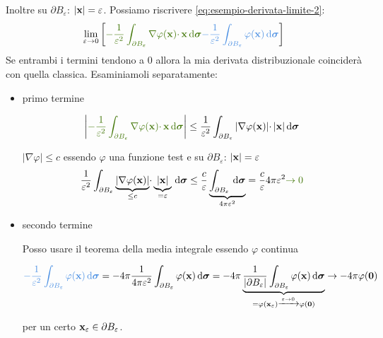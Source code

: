Inoltre su $\displaystyle \partial B_{\varepsilon }$: $\displaystyle | \mathbf{x}| =\varepsilon $. Possiamo riscrivere \eqref{eq:esempio-derivata-limite-2}:
\begin{equation*}
    \lim _{\varepsilon \rightarrow 0}\left[\textcolor[rgb]{0.25,0.46,0.02}{-\frac{1}{\varepsilon ^{2}}\int _{\partial B_{\varepsilon }} \nabla \varphi (\x) \cdotp \x \dsig }\textcolor[rgb]{0.29,0.56,0.89}{-\frac{1}{\varepsilon ^{2}}\int _{\partial B_{\varepsilon }} \varphi (\x) \dsig }\right]
\end{equation*}
Se entrambi i termini tendono a $0$ allora la mia derivata distribuzionale coinciderà con quella classica. Esaminiamoli separatamente:
\begin{itemize}
    \item primo termine

          \begin{equation*}
              \left| \textcolor[rgb]{0.25,0.46,0.02}{-\frac{1}{\varepsilon ^{2}}\int _{\partial B_{\varepsilon }} \nabla \varphi (\x) \cdotp \x \dsig }\right| \leqslant \frac{1}{\varepsilon ^{2}}\int _{\partial B_{\varepsilon }}| \nabla \varphi (\x)| \cdotp | \x| \dsig
          \end{equation*}

          $\displaystyle | \nabla \varphi | \leqslant c$ essendo $\displaystyle \varphi $ una funzione test e su $\displaystyle \partial B_{\varepsilon }$: $\displaystyle | \mathbf{x}| =\varepsilon $
          \begin{equation*}
              \frac{1}{\varepsilon ^{2}}\int _{\partial B_{\varepsilon }}\underbrace{| \nabla \varphi (\x)| }_{\leqslant c} \cdotp \underbrace{| \x| }_{=\varepsilon } \dsig \leqslant \frac{c}{\varepsilon }\underbrace{\int _{\partial B_{\varepsilon }} \dsig }_{4\pi \varepsilon ^{2}} =\frac{c}{\varepsilon } 4\pi \varepsilon ^{2}\textcolor[rgb]{0.25,0.46,0.02}{\rightarrow 0}
          \end{equation*}
    \item secondo termine

          Posso usare il teorema della media integrale essendo $\displaystyle \varphi $ continua

          \begin{equation*}
              \textcolor[rgb]{0.29,0.56,0.89}{-\frac{1}{\varepsilon ^{2}}\int _{\partial B_{\varepsilon }} \varphi (\x) \dsig } =-4\pi \frac{1}{4\pi \varepsilon ^{2}}\int _{\partial B_{\varepsilon }} \varphi (\x) \dsig =-4\pi \underbrace{\frac{1}{| \partial B_{\varepsilon }| }\int _{\partial B_{\varepsilon }} \varphi (\x) \dsig }_{=\varphi (\x_{\varepsilon })\xrightarrow{\varepsilon \rightarrow 0} \varphi (\zer)}\rightarrow -4\pi \varphi (\zer)
          \end{equation*}

          per un certo $\displaystyle \mathbf{x}_{\varepsilon } \in \partial B_{\varepsilon }$.
\end{itemize}

